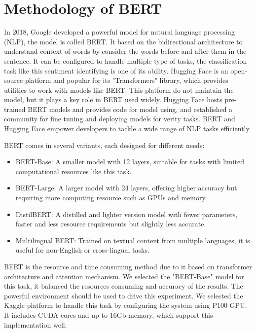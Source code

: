 \section{Methodology of BERT}

In 2018, Google developed a powerful model for natural language processing (NLP), the model is called BERT. It based on the bidirectional architecture to understand context of words by consider the words before and after them in the sentence. It can be configured to handle multiple type of tasks, the classification task like this sentiment identifying is one of its ability. Hugging Face is an open-source platform and popular for its "Transformers" library, which provides utilities to work with models like BERT. This platform do not maintain the model, but it plays a key role in BERT used widely. Hugging Face hosts pre-trained BERT models and provides code for model using, and established a community for fine tuning and deploying models for verity tasks. BERT and Hugging Face empower developers to tackle a wide range of NLP tasks efficiently.

BERT comes in several variants, each designed for different needs:

\begin{itemize}
    \item BERT-Base: A smaller model with 12 layers, suitable for tasks with limited computational resources like this task.
    \item BERT-Large: A larger model with 24 layers, offering higher accuracy but requiring more computing resource such as GPUs and memory.
    \item DistilBERT: A distilled and lighter version model with fewer parameters, faster and less resource requirements but slightly less accurate.
    \item Multilingual BERT: Trained on textual content from multiple languages, it is useful for non-English or cross-lingual tasks.
\end{itemize}

BERT is the resource and time consuming method due to it based on transformer architecture and attention mechanism. We selected the "BERT-Base" model for this task, it balanced the resources consuming and accuracy of the results. The powerful environment should be used to drive this experiment. We selected the Kaggle platform to handle this task by configuring the system using P100 GPU. It includes CUDA cores and up to 16Gb memory, which support this implementation well.

